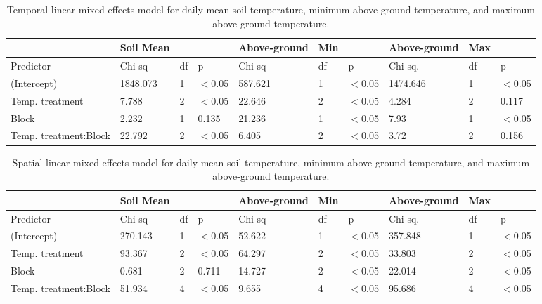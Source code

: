 \documentclass{article}
\begin{document}
\begin{table}[ht]
\centering
\caption{Temporal linear mixed-effects model for daily mean soil temperature, minimum above-ground temperature, and maximum above-ground temperature.} 
\label{table:blocks_time}
\begin{tabular}{|p{}|p{}p{}p{}|p{}p{}p{}|p{}p{}p{}|}
   \hline
 & Soil   Mean &  &  & Above-ground & Min &  & Above-ground & Max &  \\ 
   \hline
Predictor & Chi-sq & df & p & Chi-sq & df & p & Chi-sq. & df & p \\ 
   \hline
(Intercept) & 1848.073 & 1 & $<$0.05 & 587.621 & 1 & $<$0.05 & 1474.646 & 1 & $<$0.05 \\ 
  Temp. treatment & 7.788 & 2 & $<$0.05 & 22.646 & 2 & $<$0.05 & 4.284 & 2 & 0.117 \\ 
  Block & 2.232 & 1 & 0.135 & 21.236 & 1 & $<$0.05 & 7.93 & 1 & $<$0.05 \\ 
  Temp. treatment:Block & 22.792 & 2 & $<$0.05 & 6.405 & 2 & $<$0.05 & 3.72 & 2 & 0.156 \\ 
   \hline
\end{tabular}
\end{table}%
\begin{table}[ht]
\centering
\caption{Spatial linear mixed-effects model for daily mean soil temperature, minimum above-ground temperature, and maximum above-ground temperature.} 
\label{table:blocks_space}
\begin{tabular}{|p{}|p{}p{}p{}|p{}p{}p{}|p{}p{}p{}|}
   \hline
 & Soil   Mean &  &  & Above-ground & Min &  & Above-ground & Max &  \\ 
   \hline
Predictor & Chi-sq & df & p & Chi-sq & df & p & Chi-sq. & df & p \\ 
   \hline
(Intercept) & 270.143 & 1 & $<$0.05 & 52.622 & 1 & $<$0.05 & 357.848 & 1 & $<$0.05 \\ 
  Temp. treatment & 93.367 & 2 & $<$0.05 & 64.297 & 2 & $<$0.05 & 33.803 & 2 & $<$0.05 \\ 
  Block & 0.681 & 2 & 0.711 & 14.727 & 2 & $<$0.05 & 22.014 & 2 & $<$0.05 \\ 
  Temp. treatment:Block & 51.934 & 4 & $<$0.05 & 9.655 & 4 & $<$0.05 & 95.686 & 4 & $<$0.05 \\ 
   \hline
\end{tabular}
\end{table}
\end{document}
